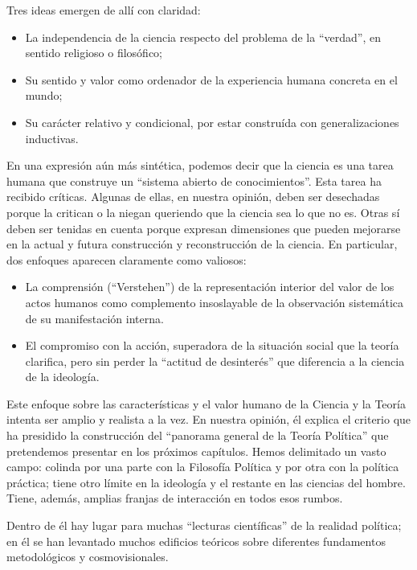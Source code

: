 \documentclass[
]{book}
\providecommand{\tightlist}{%
  \setlength{\itemsep}{0pt}\setlength{\parskip}{0pt}}
\begin{document}
Tres ideas emergen de allí con claridad:

\begin{itemize}
\tightlist
\item
  La independencia de la ciencia respecto del problema de la ``verdad'', en sentido religioso o filosófico;
\item
  Su sentido y valor como ordenador de la experiencia humana concreta en el mundo;
\item
  Su carácter relativo y condicional, por estar construída con generalizaciones inductivas.
\end{itemize}

En una expresión aún más sintética, podemos decir que la ciencia es una tarea humana que construye un ``sistema abierto de conocimientos''. Esta tarea ha recibido críticas. Algunas de ellas, en nuestra opinión, deben ser desechadas porque la critican o la niegan queriendo que la ciencia sea lo que no es. Otras sí deben ser tenidas en cuenta porque expresan dimensiones que pueden mejorarse en la actual y futura construcción y reconstrucción de la ciencia. En particular, dos enfoques aparecen claramente como valiosos:

\begin{itemize}
\tightlist
\item
  La comprensión (``Verstehen'') de la representación interior del valor de los actos humanos como complemento insoslayable de la observación sistemática de su manifestación interna.
\item
  El compromiso con la acción, superadora de la situación social que la teoría clarifica, pero sin perder la ``actitud de desinterés'' que diferencia a la ciencia de la ideología.
\end{itemize}

Este enfoque sobre las características y el valor humano de la Ciencia y la Teoría intenta ser amplio y realista a la vez. En nuestra opinión, él explica el criterio que ha presidido la construcción del ``panorama general de la Teoría Política'' que pretendemos presentar en los próximos capítulos. Hemos delimitado un vasto campo: colinda por una parte con la Filosofía Política y por otra con la política práctica; tiene otro límite en la ideología y el restante en las ciencias del hombre. Tiene, además, amplias franjas de interacción en todos esos rumbos.

Dentro de él hay lugar para muchas ``lecturas científicas'' de la realidad política; en él se han levantado muchos edificios teóricos sobre diferentes fundamentos metodológicos y cosmovisionales.
\end{document}

